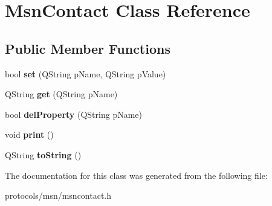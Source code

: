 \hypertarget{classMsnContact}{
\section{MsnContact Class Reference}
\label{classMsnContact}
}
\subsection*{Public Member Functions}
\begin{DoxyCompactItemize}
\item 
\hypertarget{classMsnContact_a00ac0df3e7a006c09e4d9359109e745a}{
bool {\bfseries set} (QString pName, QString pValue)}
\label{classMsnContact_a00ac0df3e7a006c09e4d9359109e745a}

\item 
\hypertarget{classMsnContact_ae0a8d5af118d4cd4563faf0172d63c49}{
QString {\bfseries get} (QString pName)}
\label{classMsnContact_ae0a8d5af118d4cd4563faf0172d63c49}

\item 
\hypertarget{classMsnContact_adfd76fa3929a48471aa90e6e25833f36}{
bool {\bfseries delProperty} (QString pName)}
\label{classMsnContact_adfd76fa3929a48471aa90e6e25833f36}

\item 
\hypertarget{classMsnContact_a0f0a7369cde876bd2e8e5fa89bc47888}{
void {\bfseries print} ()}
\label{classMsnContact_a0f0a7369cde876bd2e8e5fa89bc47888}

\item 
\hypertarget{classMsnContact_af4e22680ec4504831d0f98f1b2f48630}{
QString {\bfseries toString} ()}
\label{classMsnContact_af4e22680ec4504831d0f98f1b2f48630}

\end{DoxyCompactItemize}


The documentation for this class was generated from the following file:\begin{DoxyCompactItemize}
\item 
protocols/msn/msncontact.h\end{DoxyCompactItemize}
